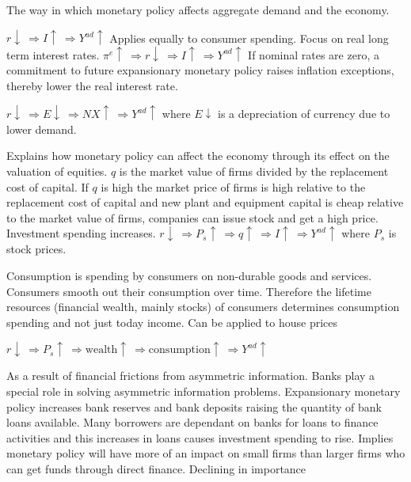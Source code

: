 \documentclass[12pt]{examnotes}
\begin{document}

\ra The way in which monetary policy affects aggregate demand and the economy.

$r \downarrow \ \Rightarrow  I \uparrow \ \Rightarrow  Y^{ad} \uparrow$
\ra Applies equally to consumer spending.
\ra Focus on real long term interest rates.
$\pi^e \uparrow \ \Rightarrow r \downarrow \ \Rightarrow  I \uparrow \ \Rightarrow  Y^{ad} \uparrow$
\ra If nominal rates are zero, a commitment to future expansionary monetary policy raises inflation exceptions, thereby lower the real interest rate.

$r \downarrow \ \Rightarrow E \downarrow \ \Rightarrow NX \uparrow \ \Rightarrow  Y^{ad} \uparrow$ where $E \downarrow$ is a depreciation of currency due to lower demand.

\vspace{6pt}
\ra Explains how monetary policy can affect the economy through its effect on the valuation of equities.
\ra $q$ is the market value of firms divided by the replacement cost of capital. 
\ra If $q$ is high the market price of firms is high relative to the replacement cost of capital and new plant and equipment capital is cheap relative to the market value of firms, companies can issue stock and get a high price. Investment spending increases.
$r \downarrow \ \Rightarrow P_s  \uparrow \ \Rightarrow q \uparrow \ \Rightarrow  I \uparrow \ \Rightarrow Y^{ad} \uparrow$ where $P_s$ is stock prices.
\vspace{6pt}

\ra Consumption is spending by consumers on non-durable goods and services. 
\ra Consumers smooth out their consumption over time.
\ra Therefore the lifetime resources (financial wealth, mainly stocks) of consumers determines consumption spending and not just today income. 
\ra Can be applied to house prices

$r \downarrow \ \Rightarrow P_s  \uparrow \ \Rightarrow \text{wealth} \uparrow \ \Rightarrow  \text{consumption} \uparrow \ \Rightarrow Y^{ad} \uparrow$ 

\ra As a result of financial frictions from asymmetric information.
\ra Banks play a special role in solving asymmetric information problems.
\ra Expansionary monetary policy increases bank reserves and bank deposits raising the quantity of bank loans available. 
\ra Many borrowers are dependant on banks for loans to finance activities and this increases in loans causes investment spending to rise.
\ra Implies  monetary policy will have more of an impact on small firms than larger firms who can get funds through direct finance.
\ra Declining in importance
\end{document}
